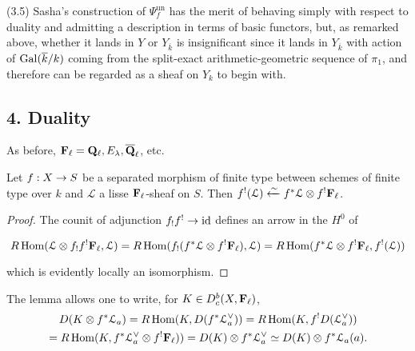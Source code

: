 \documentclass[deligne.tex]{subfiles}
\begin{document}
(3.5) Sasha's construction of
$\Psi_f^{\mathrm{un}}$ has the merit of behaving simply with respect to
duality and admitting a description in terms of basic functors, but, as
remarked above, whether it lands in $Y$ or $Y_{\overline k}$ is 
insignificant since it lands in $Y_{\overline k}$ with action of
$\operatorname{Gal}(\overline k/k)$ coming from the split-exact arithmetic-geometric
sequence of $\pi_1$, and therefore can be regarded as a sheaf on $Y_k$ to
begin with.

\subsection*{4. Duality} As before,
$\mathbf{F}_\ell=\mathbf{Q}_\ell,E_\lambda,\overline{\mathbf{Q}}_\ell$, etc.
\begin{lemma*}
	Let $f:X\rightarrow S$ be a separated morphism of finite type between schemes of
	finite type over $k$ and $\mathcal L$ a lisse $\mathbf{F}_\ell$-sheaf on $S$.
	Then $f^!(\mathcal L)\xleftarrow\sim f^*\mathcal L\otimes f^!\mathbf{F}_\ell$.
\end{lemma*}
\begin{proof}
The counit of adjunction $f_!f^!\rightarrow\operatorname{id}$ defines an arrow in the $H^0$ of
\begin{ceqn}\begin{equation*}
	R\operatorname{Hom}(\mathcal L\otimes f_!f^!\mathbf{F}_\ell,\mathcal L)
	=R\operatorname{Hom}(f_!(f^*\mathcal L\otimes f^!\mathbf{F}_\ell),\mathcal L)
	=R\operatorname{Hom}(f^*\mathcal L\otimes f^!\mathbf{F}_\ell,f^!(\mathcal L))
\end{equation*}\end{ceqn}
which is evidently locally an isomorphism.
\end{proof}
The lemma allows one to write, for $K\in D_c^b(X,\mathbf{F}_\ell)$,
\begin{multline*}
	D(K\otimes f^*\mathcal L_a)
	=R\operatorname{Hom}(K,D(f^*\mathcal L_a^\vee))
	=R\operatorname{Hom}(K,f^!D(\mathcal L_a^\vee)) \\
	=R\operatorname{Hom}(K,f^*\mathcal L_a^\vee\otimes f^!\mathbf{F}_\ell))
	=D(K)\otimes f^*\mathcal L_a^\vee
	\simeq D(K)\otimes f^*\mathcal L_a(a).
\end{multline*}
\end{document}
